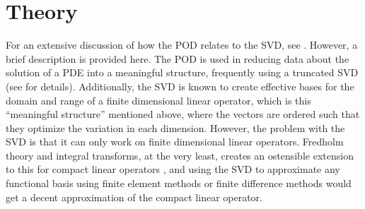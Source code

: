\documentclass[12pt]{article}
\begin{document}
    \section{Theory}
    For an extensive discussion of how the POD relates to the SVD, see \cite{pod_book}. However, a brief description is provided here. The POD is used in reducing data about the solution of a PDE into a meaningful structure, frequently using a truncated SVD (see \cite{trefethen_bau} for details). Additionally, the SVD is known to create effective bases for the domain and range of a finite dimensional linear operator, which is this ``meaningful structure'' mentioned above, where the vectors are ordered such that they optimize the variation in each dimension. However, the problem with the SVD is that it can only work on finite dimensional linear operators. Fredholm theory and integral transforms, at the very least, creates an ostensible extension to this for compact linear operators \cite{kreyszig}, and using the SVD to approximate any functional basis using finite element methods or finite difference methods would get a decent approximation of the compact linear operator.
\end{document}
